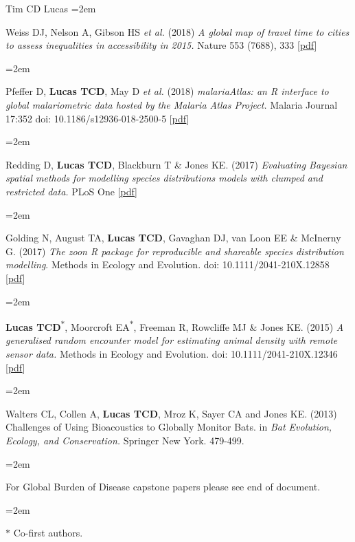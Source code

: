 \documentclass{scrartcl}
\newcommand{\MarginText}[1]{\marginpar{\raggedleft\itshape\small#1}} %
\newcommand{\Description}[1]{\hangindent=2em\hangafter=0\noindent\raggedright\footnotesize{#1}\par\normalsize\vspace{1em}} %
\begin{document}
\begin{cv}{Tim {\Large CD} Lucas}
\Description{\MarginText{2018}Weiss DJ, Nelson A, Gibson HS \emph{et al.} (2018) \emph{A global map of travel time to cities to assess inequalities in accessibility in 2015.} Nature 553 (7688), 333 [\href{https://www.nature.com/articles/nature25181.pdf}{pdf}]}

\Description{Pfeffer D, \textbf{Lucas TCD}, May D \emph{et al.} (2018) \emph{malariaAtlas: an R interface to global malariometric data hosted by the Malaria Atlas Project.} Malaria Journal 17:352 doi: 10.1186/s12936-018-2500-5 [\href{https://malariajournal.biomedcentral.com/track/pdf/10.1186/s12936-018-2500-5}{pdf}]}


\Description{\MarginText{2017}Redding D, \textbf{Lucas TCD}, Blackburn T \& Jones KE. (2017) \emph{Evaluating Bayesian spatial methods for modelling species distributions models with clumped and restricted data.} PLoS One [\href{https://journals.plos.org/plosone/article/file?id=10.1371/journal.pone.0187602&type=printable}{pdf}]}

\Description{Golding N, August TA, \textbf{Lucas TCD}, Gavaghan DJ, van Loon EE \& McInerny G. (2017) \emph{The zoon R package for reproducible and shareable species distribution modelling}. Methods in Ecology and Evolution. doi: 10.1111/2041-210X.12858 [\href{http://onlinelibrary.wiley.com/doi/10.1111/2041-210X.12858/pdf}{pdf}]}

\Description{\MarginText{2015}\textbf{Lucas TCD}\textsuperscript{$\ast$}, Moorcroft EA\textsuperscript{$\ast$}, Freeman R, Rowcliffe MJ \& Jones KE. (2015) \emph{A generalised random encounter model for estimating animal density with remote sensor data.} Methods in Ecology and Evolution. doi: 10.1111/2041-210X.12346 [\href{http://onlinelibrary.wiley.com/doi/10.1111/2041-210X.12346/epdf}{pdf}]}

\Description{\MarginText{2013}Walters CL, Collen A, \textbf{Lucas TCD}, Mroz K, Sayer CA and Jones KE. (2013) Challenges of Using Bioacoustics to Globally Monitor Bats. in \emph{Bat Evolution, Ecology, and Conservation.} Springer New York. 479-499.}

\Description{\MarginText{GBD}For Global Burden of Disease capstone papers please see end of document.}

\Description{\MarginText{} \scriptsize{ $\ast$ Co-first authors. } }



{\color{Maroon}}\vspace{1em}



\end{cv}
\end{document}
